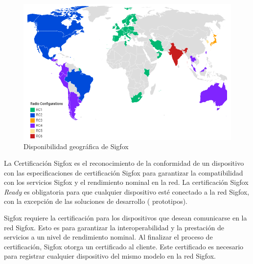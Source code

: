 \begin{figure}[h]
	\centering
	\includegraphics[scale=.65]{./Figures/coverageSigfox.PNG}
	\caption{Disponibilidad geográfica de Sigfox}
	\label{fig:coverageSigfox}
\end{figure}

La Certificación Sigfox es el reconocimiento de la conformidad de un dispositivo con las especificaciones de certificación Sigfox para garantizar la compatibilidad con los servicios Sigfox y el rendimiento nominal en la red. La certificación Sigfox \textit{Ready} es obligatoria para que cualquier dispositivo esté conectado a la red Sigfox, con la excepción de las soluciones de desarrollo ( prototipos).

Sigfox requiere la certificación para los dispositivos que desean comunicarse en la red Sigfox. Esto es para garantizar la interoperabilidad y la prestación de servicios a un nivel de rendimiento nominal. Al finalizar el proceso de certificación, Sigfox otorga un certificado al cliente. Este certificado es necesario para registrar cualquier dispositivo del mismo modelo en la red Sigfox.

